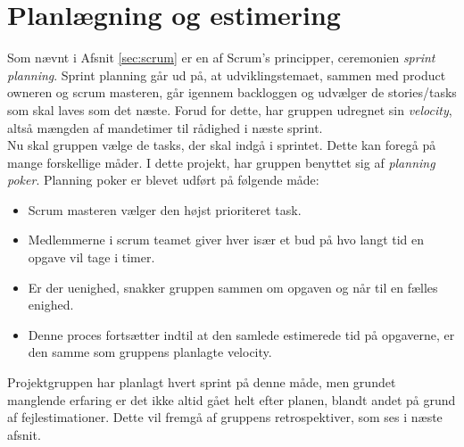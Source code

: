 \section{Planlægning og estimering}\label{sec:planning}
Som nævnt i Afsnit \ref{sec:scrum} er en af Scrum's principper, ceremonien \textit{sprint planning}.
Sprint planning går ud på, at udviklingstemaet, sammen med product owneren og scrum masteren, går igennem
backloggen og udvælger de stories/tasks som skal laves som det næste. Forud for dette, har gruppen udregnet sin 
\textit{velocity}, altså mængden af mandetimer til rådighed i næste sprint. \\

Nu skal gruppen vælge de tasks, der skal indgå i sprintet. Dette kan foregå på mange forskellige måder.
I dette projekt, har gruppen benyttet sig af \textit{planning poker}. Planning poker er blevet udført på følgende måde:

\begin{itemize}
    \item Scrum masteren vælger den højst prioriteret task.
    \item Medlemmerne i scrum teamet giver hver især et bud på hvo langt tid en opgave vil tage i timer.
    \item Er der uenighed, snakker gruppen sammen om opgaven og når til en fælles enighed.
    \item Denne proces fortsætter indtil at den samlede estimerede tid på opgaverne, er den samme som gruppens planlagte velocity.
\end{itemize}

Projektgruppen har planlagt hvert sprint på denne måde, men grundet manglende erfaring er det ikke altid gået helt efter planen, blandt andet på grund
af fejlestimationer. Dette vil fremgå af gruppens retrospektiver, som ses i næste afsnit.
